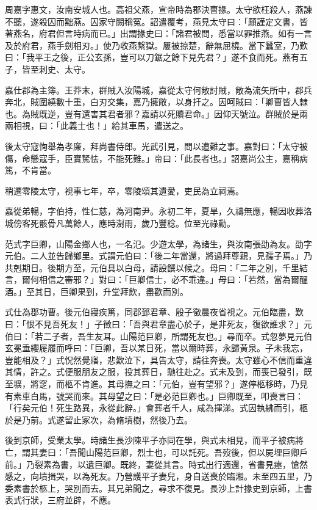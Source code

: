 \begin{pinyinscope}
周嘉字惠文，汝南安城人也。高祖父燕，宣帝時為郡決曹掾。太守欲枉殺人，燕諫不聽，遂殺囚而黜燕。囚家守闕稱冤。詔遣覆考，燕見太守曰：「願謹定文書，皆著燕名，府君但言時病而已。」出謂掾史曰：「諸君被問，悉當以罪推燕。如有一言及於府君，燕手劍相刃。」使乃收燕繫獄。屢被掠楚，辭無屈橈。當下蠶室，乃歎曰：「我平王之後，正公玄孫，豈可以刀鋸之餘下見先君？」遂不食而死。燕有五子，皆至刺史、太守。

嘉仕郡為主簿。王莽末，群賊入汝陽城，嘉從太守何敞討賊，敞為流矢所中，郡兵奔北，賊圍繞數十重，白刃交集，嘉乃擁敞，以身扞之。因呵賊曰：「卿曹皆人隸也。為賊既逆，豈有還害其君者邪？嘉請以死贖君命。」因仰天號泣。群賊於是兩兩相視，曰：「此義士也！」給其車馬，遣送之。

後太守寇恂舉為孝廉，拜尚書侍郎。光武引見，問以遭難之事。嘉對曰：「太守被傷，命懸寇手，臣實駑怯，不能死難。」帝曰：「此長者也。」詔嘉尚公主，嘉稱病篤，不肯當。

稍遷零陵太守，視事七年，卒，零陵頌其遺愛，吏民為立祠焉。

嘉從弟暢，字伯持，性仁慈，為河南尹。永初二年，夏旱，久禱無應，暢因收葬洛城傍客死骸骨凡萬餘人，應時澍雨，歲乃豐稔。位至光祿勳。

范式字巨卿，山陽金鄉人也，一名氾。少遊太學，為諸生，與汝南張劭為友。劭字元伯。二人並告歸鄉里。式謂元伯曰：「後二年當還，將過拜尊親，見孺子焉。」乃共剋期日。後期方至，元伯具以白母，請設饌以候之。母曰：「二年之別，千里結言，爾何相信之審邪？」對曰：「巨卿信士，必不乖違。」母曰：「若然，當為爾醞酒。」至其日，巨卿果到，升堂拜飲，盡歡而別。

式仕為郡功曹。後元伯寢疾篤，同郡郅君章、殷子徵晨夜省視之。元伯臨盡，歎曰：「恨不見吾死友！」子徵曰：「吾與君章盡心於子，是非死友，復欲誰求？」元伯曰：「若二子者，吾生友耳。山陽范巨卿，所謂死友也。」尋而卒。式忽夢見元伯玄冕垂纓屣履而呼曰：「巨卿，吾以某日死，當以爾時葬，永歸黃泉。子未我忘，豈能相及？」式怳然覺寤，悲歎泣下，具告太守，請往奔喪。太守雖心不信而重違其情，許之。式便服朋友之服，投其葬日，馳往赴之。式未及到，而喪已發引，既至壙，將窆，而柩不肯進。其母撫之曰：「元伯，豈有望邪？」遂停柩移時，乃見有素車白馬，號哭而來。其母望之曰：「是必范巨卿也。」巨卿既至，叩喪言曰：「行矣元伯！死生路異，永從此辭。」會葬者千人，咸為揮涕。式因執紼而引，柩於是乃前。式遂留止冢次，為脩墳樹，然後乃去。

後到京師，受業太學。時諸生長沙陳平子亦同在學，與式未相見，而平子被病將亡，謂其妻曰：「吾聞山陽范巨卿，烈士也，可以託死。吾歿後，但以屍埋巨卿戶前。」乃裂素為書，以遺巨卿。既終，妻從其言。時式出行適還，省書見瘞，愴然感之，向墳揖哭，以為死友。乃營護平子妻兒，身自送喪於臨湘。未至四五里，乃委素書於柩上，哭別而去。其兄弟聞之，尋求不復見。長沙上計掾史到京師，上書表式行狀，三府並辟，不應。


\end{pinyinscope}

